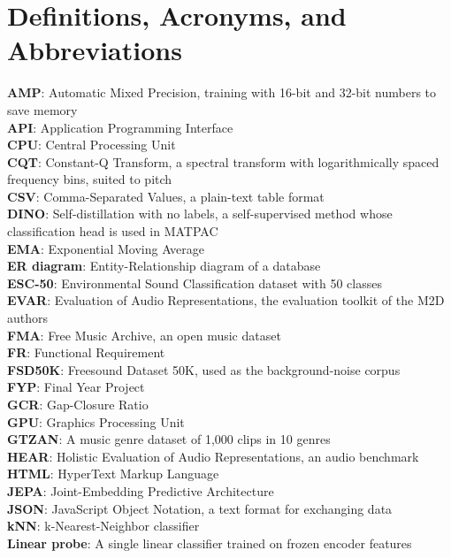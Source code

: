 \documentclass{FastFyp}
\begin{document}
\section{Definitions, Acronyms, and Abbreviations}
\label{sec:intro-defs}
\textbf{AMP}: Automatic Mixed Precision, training with 16-bit and 32-bit numbers to save memory\\
\textbf{API}: Application Programming Interface\\
\textbf{CPU}: Central Processing Unit\\
\textbf{CQT}: Constant-Q Transform, a spectral transform with logarithmically spaced frequency bins, suited to pitch\\
\textbf{CSV}: Comma-Separated Values, a plain-text table format\\
\textbf{DINO}: Self-distillation with no labels, a self-supervised method whose classification head is used in MATPAC\\
\textbf{EMA}: Exponential Moving Average\\
\textbf{ER diagram}: Entity-Relationship diagram of a database\\
\textbf{ESC-50}: Environmental Sound Classification dataset with 50 classes\\
\textbf{EVAR}: Evaluation of Audio Representations, the evaluation toolkit of the M2D authors\\
\textbf{FMA}: Free Music Archive, an open music dataset\\
\textbf{FR}: Functional Requirement\\
\textbf{FSD50K}: Freesound Dataset 50K, used as the background-noise corpus\\
\textbf{FYP}: Final Year Project\\
\textbf{GCR}: Gap-Closure Ratio\\
\textbf{GPU}: Graphics Processing Unit\\
\textbf{GTZAN}: A music genre dataset of 1,000 clips in 10 genres\\
\textbf{HEAR}: Holistic Evaluation of Audio Representations, an audio benchmark\\
\textbf{HTML}: HyperText Markup Language\\
\textbf{JEPA}: Joint-Embedding Predictive Architecture\\
\textbf{JSON}: JavaScript Object Notation, a text format for exchanging data\\
\textbf{kNN}: k-Nearest-Neighbor classifier\\
\textbf{Linear probe}: A single linear classifier trained on frozen encoder features\\
\end{document}
